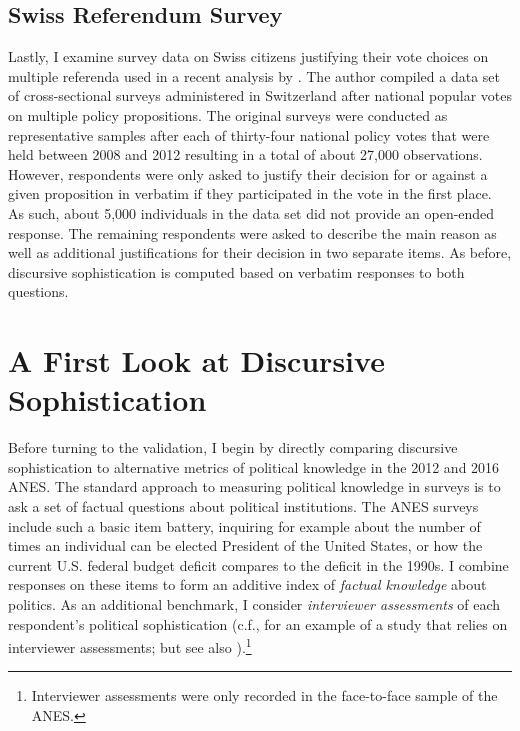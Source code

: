\subsection{Swiss Referendum Survey}
Lastly, I examine survey data on Swiss citizens justifying their vote choices on multiple referenda used in a recent analysis by \citet{colombo2016justifications}. The author compiled a data set of cross-sectional surveys administered in Switzerland after national popular votes on multiple policy propositions. The original surveys were conducted as representative samples after each of thirty-four national policy votes that were held between 2008 and 2012 resulting in a total of about 27,000 observations. However, respondents were only asked to justify their decision for or against a given proposition in verbatim if they participated in the vote in the first place. As such, about 5,000 individuals in the data set did not provide an open-ended response. The remaining respondents were asked to describe the main reason as well as additional justifications for their decision in two separate items. As before, discursive sophistication is computed based on verbatim responses to both questions.



\section{A First Look at Discursive Sophistication}

Before turning to the validation, I begin by directly comparing discursive sophistication to alternative metrics of political knowledge in the 2012 and 2016 ANES. The standard approach to measuring political knowledge in surveys is to ask a set of factual questions about political institutions. The ANES surveys include such a basic item battery, inquiring for example about the number of times an individual can be elected President of the United States, or how the current U.S. federal budget deficit compares to the deficit in the 1990s. I combine responses on these items to form an additive index of \textit{factual knowledge} about politics. As an additional benchmark, I consider \textit{interviewer assessments} of each respondent's political sophistication (c.f., \citealt{bartels2005homer} for an example of a study that relies on interviewer assessments; but see also \citealt{ryan2011accuracy}).\footnote{Interviewer assessments were only recorded in the face-to-face sample of the ANES.}

